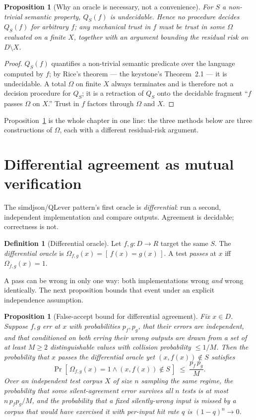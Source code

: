 \documentclass[11pt,oneside]{book}
\theoremstyle{definition}
\newtheorem{definition}{Definition}[chapter]
\theoremstyle{plain}
\newtheorem{proposition}[theorem]{Proposition}
\theoremstyle{remark}
\begin{document}
\begin{proposition}[Why an oracle is necessary, not a convenience]\label{prop:necessity}
For $S$ a non-trivial semantic property, $Q_S(f)$ is undecidable. Hence no procedure decides
$Q_S(f)$ for arbitrary $f$; any mechanical trust in $f$ must be trust in some $\Omega$ evaluated
on a finite $X$, together with an argument bounding the residual risk on $D\setminus X$.
\end{proposition}

\begin{proof}
$Q_S(f)$ quantifies a non-trivial semantic predicate over the language computed by $f$; by
Rice's theorem \cite{rice1953} --- the keystone's Theorem~2.1 --- it is undecidable. A total
$\Omega$ on finite $X$ always terminates and is therefore not a decision procedure for $Q_S$; it
is a retraction of $Q_S$ onto the decidable fragment ``$f$ passes $\Omega$ on $X$.'' Trust in $f$
factors through $\Omega$ and $X$.
\end{proof}

Proposition~\ref{prop:necessity} is the whole chapter in one line: the three methods below are
three constructions of $\Omega$, each with a different residual-risk argument.

\section{Differential agreement as mutual verification}

The simdjson/QLever pattern's first oracle is \emph{differential}: run a second, independent
implementation and compare outputs. Agreement is decidable; correctness is not.

\begin{definition}[Differential oracle]\label{def:diff}
Let $f,g:D\to R$ target the same $S$. The \emph{differential oracle} is
$\Omega_{f,g}(x)=[\,f(x)=g(x)\,]$. A test \emph{passes} at $x$ iff $\Omega_{f,g}(x)=1$.
\end{definition}

A pass can be wrong in only one way: both implementations wrong \emph{and} wrong identically.
The next proposition bounds that event under an explicit independence assumption.

\begin{proposition}[False-accept bound for differential agreement]\label{prop:diff-bound}
Fix $x\in D$. Suppose $f,g$ err at $x$ with probabilities $p_f,p_g$, that their errors are
independent, and that conditioned on both erring their wrong outputs are drawn from a set of at
least $M\ge 2$ distinguishable values with collision probability $\le 1/M$. Then the probability
that $x$ passes the differential oracle yet $(x,f(x))\notin S$ satisfies
\[
\Pr[\,\Omega_{f,g}(x)=1 \wedge (x,f(x))\notin S\,]\;\le\;\frac{p_f\,p_g}{M}.
\]
Over an independent test corpus $X$ of size $n$ sampling the same regime, the probability that
some silent-agreement error survives all $n$ tests is at most $n\,p_f p_g/M$, and the probability
that a \emph{fixed} silently-wrong input is missed by a corpus that would have exercised it with
per-input hit rate $q$ is $(1-q)^{n}\to 0$.
\end{proposition}
\end{document}
